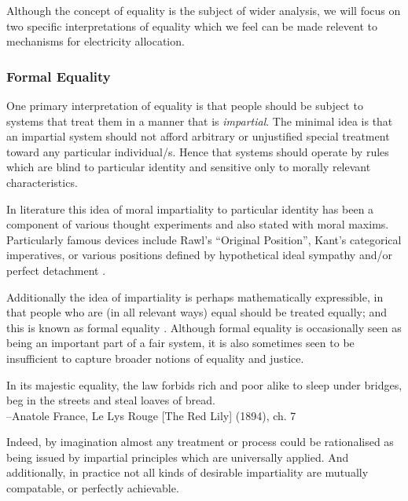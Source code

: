 Although the concept of equality is the subject of wider analysis, we will focus on two specific interpretations of equality which we feel can be made relevent to mechanisms for electricity allocation.

\subsubsection{Formal Equality}

One primary interpretation of equality is that people should be subject to systems that treat them in a manner that is \textit{impartial}. The minimal idea is that an impartial system should not afford arbitrary or unjustified special treatment toward any particular individual/s. Hence that systems should operate by rules which are blind to particular identity and sensitive only to morally relevant characteristics.

In literature this idea of moral impartiality to particular identity has been a component of various thought experiments and also stated with moral maxims.
Particularly famous devices include Rawl's ``Original Position'', Kant's categorical imperatives, or various positions defined by hypothetical ideal sympathy and/or perfect detachment \cite{smithGutenberg, nla.cat-vn197822}.

Additionally the idea of impartiality is perhaps mathematically expressible, in that people who are (in all relevant ways) equal should be treated equally; and this is known as formal equality \cite{whatisbasicequalitynathan}. Although formal equality is occasionally seen as being an important part of a fair system, it is also sometimes seen to be insufficient to capture broader notions of equality and justice.

\begin{displayquote}
In its majestic equality, the law forbids rich and poor alike to sleep under bridges, beg in the streets and steal loaves of bread.\\
--Anatole France, Le Lys Rouge [The Red Lily] (1894), ch. 7
\end{displayquote}

Indeed, by imagination almost any treatment or process could be rationalised as being issued by impartial principles which are universally applied. And additionally, in practice not all kinds of desirable impartiality are mutually compatable, or perfectly achievable.\cite{Hutchinson_2019}

